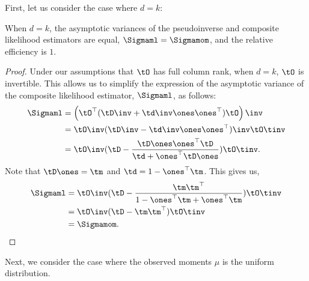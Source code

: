 First, let us consider the case where $d = k$:
\begin{lemma}[Relative efficiency when $d = k$]
  When $d = k$, the asymptotic variances of the pseudoinverse and
  composite likelihood estimators are equal, $\Sigmaml = \Sigmamom$, and the relative efficiency
  is $1$.
\end{lemma}
\begin{proof}
Under our assumptions that $\tO$ has full column rank, when $d=k$, $\tO$ is invertible. This allows us
to simplify the expression of the asymptotic variance of the composite
likelihood estimator, $\Sigmaml$, as follows:
\begin{align*}
    \Sigmaml 
      &= \left( \tO^\top(\tD\inv + \td\inv \ones \ones^\top) \tO \right)\inv \\
      &= \tO\inv (\tD\inv - \td\inv \ones \ones^\top)\inv \tO\tinv \\
      &= \tO\inv (\tD - \frac{\tD \ones \ones^\top \tD}{\td + \ones^\top \tD \ones}) \tO\tinv.
\end{align*}
Note that $\tD \ones = \tm$ and $\td = 1 - \ones^\top \tm$. This gives us,
\begin{align*}
    \Sigmaml 
      &= \tO\inv (\tD - \frac{\tm \tm^\top}{1 - \ones^\top \tm + \ones^\top \tm}) \tO\tinv \\
      &= \tO\inv (\tD - \tm \tm^\top) \tO\tinv \\
      &= \Sigmamom.
\end{align*}
\end{proof}

Next, we consider the case where the observed moments $\mu$ is the
uniform distribution.

